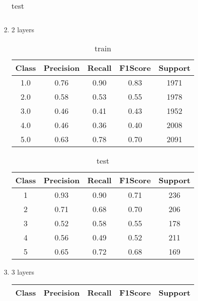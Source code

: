 \begin{enumerate}[label=(\alph*)]
\begin{enumerate}[label=\roman*.]
\begin{table}[!htb]
\begin{tabular}{ccccc}
            \end{tabular}
            \caption{test}
            \label{part f test depth 1}
        \end{table}
        \newpage
        \item 2 layers
        \begin{table}[!htb]
            \centering
            \begin{tabular}{ccccc}
            \hline
            Class & Precision & Recall & F1Score & Support \\ \hline
            1.0   & 0.76      & 0.90   & 0.83    & 1971    \\
            2.0   & 0.58      & 0.53   & 0.55    & 1978    \\
            3.0   & 0.46      & 0.41   & 0.43    & 1952    \\
            4.0   & 0.46      & 0.36   & 0.40    & 2008    \\
            5.0   & 0.63      & 0.78   & 0.70    & 2091    \\ \hline
            \end{tabular}
            \caption{train}
            \label{part f train depth 2}
        \end{table}
        \begin{table}[!htb]
            \centering
            \begin{tabular}{ccccc}
            \hline
            Class & Precision & Recall & F1Score & Support \\ \hline
            1     & 0.93      & 0.90   & 0.71    & 236     \\
            2     & 0.71      & 0.68   & 0.70    & 206     \\
            3     & 0.52      & 0.58   & 0.55    & 178     \\
            4     & 0.56      & 0.49   & 0.52    & 211     \\
            5     & 0.65      & 0.72   & 0.68    & 169     \\ \hline
            \end{tabular}
            \caption{test}
            \label{part f test depth 2}
        \end{table}
        \newpage
        \item 3 layers
        \begin{table}[!htb]
            \centering
            \begin{tabular}{ccccc}
            \hline
            Class & Precision & Recall & F1Score & Support \\ \hline

\end{tabular}
\end{table}
\end{enumerate}
\end{enumerate}
